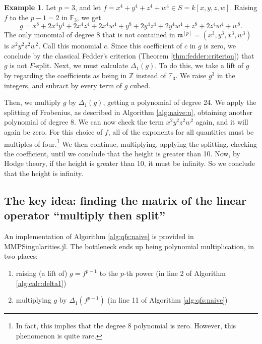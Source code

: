 \documentclass[a4paper]{article}
\theoremstyle{definition}
\newtheorem{ex}[thm]{Example}
\theoremstyle{remark}
\begin{document}
\begin{ex}
    Let \(p=3\), and let
    \(f = x^4 + y^4 + z^4 + w^4 \in S = k[x,y,z,w]\).
    Raising \(f\) to the \(p-1 = 2\) in \(\mathbb{F}_{3}\), we get
    \[
    g = x^8 + 2x^4y^4 + 2x^4z^4 + 2x^4w^4 + y^8 + 2y^4z^4 + 2y^4w^4 + z^8 + 2z^4w^4 + w^8
    .\] 
    The only monomial of degree \(8\) that is not contained
    in \(\mathfrak{m}^{[p]} = (x^{3}, y^{3}, x^{3}, w^{3})\) is \(x^{2}y^{2}z^{2}w^{2}\).
    Call this monomial \(c\).
    Since this coefficient of \(c\) in \(g\) is zero, we conclude
    by the classical Fedder's criterion (Theorem \ref{thm:fedder:criterion})
    that \(g\) is not \(F\)-split.
    Next, we must calculate \(\Delta_{1}(g)\).
    To do this, we take a lift of \(g\) by regarding the coefficients
    as being in \(\mathbb{Z}\) instead of \(\mathbb{F}_{3}\).
    We raise \(g^3\) in the integers, and subract by every term of \(g\) 
    cubed.

    Then, we multiply \(g\) by \(\Delta_{1}(g)\), getting a polynomial of degree 24.
    We apply the splitting of Frobenius, as described in Algorithm \ref{alg:naive:u}, 
    obtaining another polynomial of degree \(8\). 
    We can now check the term \(x^2y^2z^2w^2\) again, and it will again be zero. 
    For this choice of $f$, all of the exponents for all quantities 
    must be multiples of four.\footnote{
    In fact, this implies that the degree \(8\) polynomial is zero.
    However, this phenomenon is quite rare.
    }
    We then continue, multiplying, applying the splitting, checking the coefficient, 
    until we conclude that the height is greater than 10. 
    Now, by Hodge theory, if the height is greater than 10, it must be infinity. 
    So we conclude that the height is infinity.
\end{ex}

\subsection{The key idea: finding the matrix of the linear operator ``multiply then split''}

An implementation of Algorithm \ref{alg:qfs:naive}
is provided in MMPSingularities.jl.
The bottleneck ends up being polynomial multiplication, 
in two places:
\begin{enumerate}[(1)]
    \item raising (a lift of) \(g = f^{p-1}\) to the \(p\)-th power 
        (in line 2 of Algorithm \ref{alg:calc:delta1})
    \item multiplying \(g\) by \(\Delta_{1}(f^{p-1})\) 
        (in line 11 of Algorithm \ref{alg:qfs:naive})
\end{enumerate}
\end{document}
